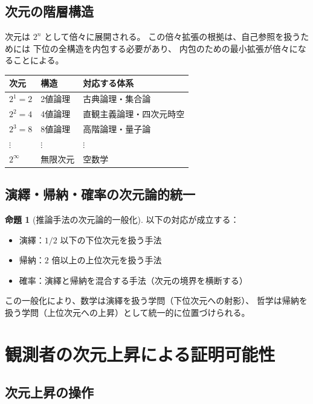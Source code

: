 \documentclass[11pt,a4paper]{article}
\theoremstyle{definition}
\newtheorem{proposition}{命題}[section]
\begin{document}
\subsection{次元の階層構造}

次元は $2^n$ として倍々に展開される。
この倍々拡張の根拠は、自己参照を扱うためには
下位の全構造を内包する必要があり、
内包のための最小拡張が倍々になることによる。

\begin{center}
\begin{tabular}{lll}
\toprule
次元 & 構造 & 対応する体系 \\
\midrule
$2^1 = 2$ & 2値論理 & 古典論理・集合論 \\
$2^2 = 4$ & 4値論理 & 直観主義論理・四次元時空 \\
$2^3 = 8$ & 8値論理 & 高階論理・量子論 \\
$\vdots$ & $\vdots$ & $\vdots$ \\
$2^\infty$ & 無限次元 & 空数学 \\
\bottomrule
\end{tabular}
\end{center}

\subsection{演繹・帰納・確率の次元論的統一}

\begin{proposition}[推論手法の次元論的一般化]
以下の対応が成立する：
\begin{itemize}
\item 演繹：$1/2$ 以下の下位次元を扱う手法
\item 帰納：$2$ 倍以上の上位次元を扱う手法
\item 確率：演繹と帰納を混合する手法（次元の境界を横断する）
\end{itemize}
\end{proposition}

この一般化により、数学は演繹を扱う学問（下位次元への射影）、
哲学は帰納を扱う学問（上位次元への上昇）として統一的に位置づけられる。

\section{観測者の次元上昇による証明可能性}

\subsection{次元上昇の操作}
\end{document}
